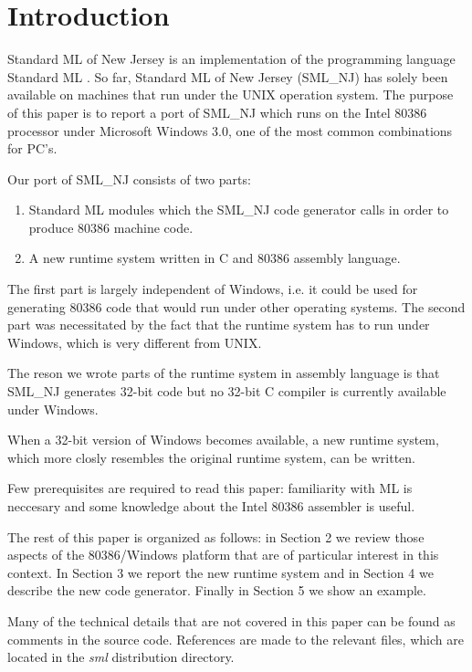 \section{Introduction} \label{sec:intro}

Standard ML of New Jersey \cite{bib:MLComp} is an implementation of
the programming language Standard ML \cite{bib:smldef}. So far,
Standard ML of New Jersey (SML\_NJ) has solely been available on
machines that run under the UNIX operation system. The purpose of
this paper is to report a port of SML\_NJ which runs on the Intel 80386
processor under Microsoft Windows 3.0, one of the most common
combinations for PC's.


Our port of SML\_NJ consists of two parts: 
\begin{enumerate} 
\item Standard ML modules which the SML\_NJ code generator calls in order to
produce 80386 machine code.
\item A new runtime system written in C and 80386 assembly language.
\end{enumerate}

The first part is largely independent of Windows, i.e. it could be
used for generating 80386 code that would run under other operating
systems. The second part was necessitated by the fact that the runtime
system has to run under Windows, which is very different from UNIX.

The reson we wrote parts of the runtime system in assembly language is
that SML\_NJ generates 32-bit code but no 32-bit C compiler is
currently available under Windows.

When a 32-bit version of Windows becomes available, a new runtime
system, which more closly resembles the original runtime system, can
be written.

Few prerequisites are required to read this paper: familiarity with ML
is neccesary and some knowledge about the Intel 80386 assembler is
useful.

The rest of this paper is organized as follows: in Section 2 we review
those aspects of the 80386/Windows platform that are of particular
interest in this context. In Section 3 we report the new runtime
system and in Section 4 we describe the new code generator. Finally in
Section 5 we show an example.

Many of the technical details that are not covered in this paper can
be found as comments in the source code. References are made to the
relevant files, which are located in the {\em sml\/} distribution directory.






